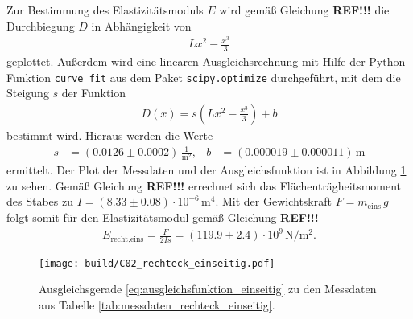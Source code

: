 \noindent
Zur Bestimmung des Elastizitätsmoduls $E$ wird gemäß Gleichung \textbf{REF!!!} die Durchbiegung $D$ in Abhängigkeit von 
\begin{align*}
    L x^2 - \frac{x^3}{3}
\end{align*}
geplottet.
Außerdem wird eine linearen Ausgleichsrechnung mit Hilfe der Python \cite[]{python} Funktion \texttt{curve\_fit} aus dem Paket
\texttt{scipy.optimize} \cite[]{scipy} durchgeführt, mit dem die Steigung $s$ der Funktion 
\begin{align}
    D(x) = s \left(L x^2 - \frac{x^3}{3}\right) + b
    \label{eq:ausgleichsfunktion_einseitig}
\end{align}
bestimmt wird.
Hieraus werden die Werte 
\begin{align*}
    s &= (\num{0.0126} \pm \num{0.0002}) \, \frac{1}{\unit{\meter^2}}, & b &= (\num{0.000019} \pm \num{0.000011}) \, \unit{\meter}
\end{align*}
ermittelt.
Der Plot der Messdaten und der Ausgleichsfunktion ist in Abbildung \ref{fig:plot_rechteck_einseitig} zu sehen.
Gemäß Gleichung \textbf{REF!!!} errechnet sich das Flächenträgheitsmoment des Stabes zu 
$I = (\num{8.33} \pm \num{0.08}) \cdot 10^{-6} \, \unit{\meter^4}$.
Mit der Gewichtskraft $F = m_\text{eins} \, g$ folgt somit für den Elastizitätsmodul gemäß Gleichung \textbf{REF!!!}
\begin{align}
    E_\text{recht,eins} = \frac{F}{2 I s} = (\num{119.9} \pm \num{2.4}) \cdot 10^9 \, \unit{\newton\per\meter^2}.
\end{align}

\begin{figure}[H]
    \centering
    \texttt{[image: build/C02\_rechteck\_einseitig.pdf]}
    \caption{Ausgleichsgerade \eqref{eq:ausgleichsfunktion_einseitig} zu den Messdaten aus Tabelle \ref{tab:messdaten_rechteck_einseitig}.}
    \label{fig:plot_rechteck_einseitig}
\end{figure}
